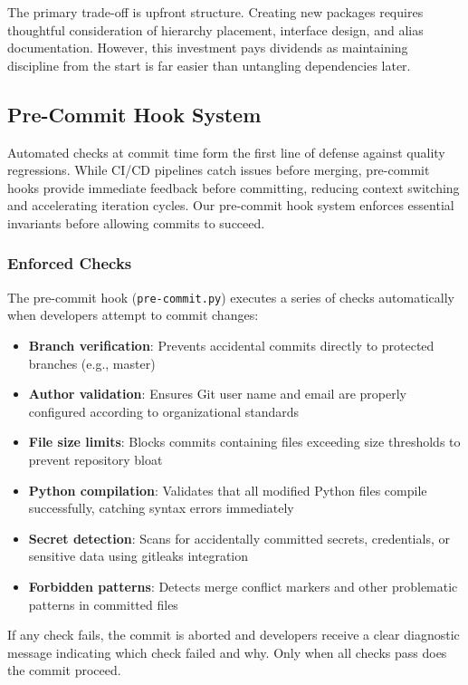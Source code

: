 The primary trade-off is upfront structure. Creating new packages
requires thoughtful consideration of hierarchy placement, interface
design, and alias documentation. However, this investment pays dividends
as maintaining discipline from the start is far easier than untangling
dependencies later.

\subsection{Pre-Commit Hook System}
Automated checks at commit time form the first line of defense against
quality regressions. While CI/CD pipelines catch issues before merging,
pre-commit hooks provide immediate feedback before committing, reducing
context switching and accelerating iteration cycles. Our pre-commit hook
system enforces essential invariants before allowing commits to succeed.

\subsubsection{Enforced Checks}
The pre-commit hook (\texttt{pre-commit.py}) executes a series of checks
automatically when developers attempt to commit changes:
\begin{itemize}
  \item \textbf{Branch verification}: Prevents accidental commits directly
    to protected branches (e.g., master)

  \item \textbf{Author validation}: Ensures Git user name and email are properly
    configured according to organizational standards

  \item \textbf{File size limits}: Blocks commits containing files exceeding
    size thresholds to prevent repository bloat

  \item \textbf{Python compilation}: Validates that all modified Python files
    compile successfully, catching syntax errors immediately

  \item \textbf{Secret detection}: Scans for accidentally committed secrets,
    credentials, or sensitive data using gitleaks integration

  \item \textbf{Forbidden patterns}: Detects merge conflict markers and other
    problematic patterns in committed files
\end{itemize}
If any check fails, the commit is aborted and developers receive a clear
diagnostic message indicating which check failed and why. Only when all checks
pass does the commit proceed.

